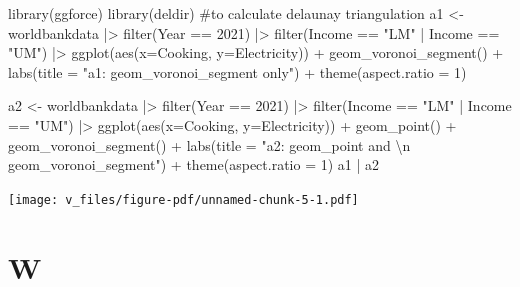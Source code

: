 \documentclass[
  letterpaper,
  DIV=11,
  numbers=noendperiod]{scrreprt}
\newenvironment{Shaded}{\begin{snugshade}}{\end{snugshade}}
\newcommand{\AttributeTok}[1]{\textcolor[rgb]{0.40,0.45,0.13}{#1}}
\newcommand{\CommentTok}[1]{\textcolor[rgb]{0.37,0.37,0.37}{#1}}
\newcommand{\DecValTok}[1]{\textcolor[rgb]{0.68,0.00,0.00}{#1}}
\newcommand{\FunctionTok}[1]{\textcolor[rgb]{0.28,0.35,0.67}{#1}}
\newcommand{\NormalTok}[1]{\textcolor[rgb]{0.00,0.23,0.31}{#1}}
\newcommand{\OtherTok}[1]{\textcolor[rgb]{0.00,0.23,0.31}{#1}}
\newcommand{\SpecialCharTok}[1]{\textcolor[rgb]{0.37,0.37,0.37}{#1}}
\newcommand{\StringTok}[1]{\textcolor[rgb]{0.13,0.47,0.30}{#1}}
\begin{document}
\begin{Shaded}
\begin{Highlighting}[]
\FunctionTok{library}\NormalTok{(ggforce)}
\FunctionTok{library}\NormalTok{(deldir) }\CommentTok{\#to calculate delaunay triangulation}
\NormalTok{a1 }\OtherTok{\textless{}{-}}\NormalTok{ worldbankdata }\SpecialCharTok{|\textgreater{}}
  \FunctionTok{filter}\NormalTok{(Year }\SpecialCharTok{==} \DecValTok{2021}\NormalTok{) }\SpecialCharTok{|\textgreater{}}
  \FunctionTok{filter}\NormalTok{(Income }\SpecialCharTok{==} \StringTok{"LM"} \SpecialCharTok{|}\NormalTok{ Income }\SpecialCharTok{==} \StringTok{"UM"}\NormalTok{) }\SpecialCharTok{|\textgreater{}}
  \FunctionTok{ggplot}\NormalTok{(}\FunctionTok{aes}\NormalTok{(}\AttributeTok{x=}\NormalTok{Cooking, }\AttributeTok{y=}\NormalTok{Electricity)) }\SpecialCharTok{+}   
  \FunctionTok{geom\_voronoi\_segment}\NormalTok{() }\SpecialCharTok{+}
  \FunctionTok{labs}\NormalTok{(}\AttributeTok{title =} \StringTok{"a1: geom\_voronoi\_segment only"}\NormalTok{) }\SpecialCharTok{+}
  \FunctionTok{theme}\NormalTok{(}\AttributeTok{aspect.ratio =} \DecValTok{1}\NormalTok{)}

\NormalTok{a2 }\OtherTok{\textless{}{-}}\NormalTok{ worldbankdata }\SpecialCharTok{|\textgreater{}}
  \FunctionTok{filter}\NormalTok{(Year }\SpecialCharTok{==} \DecValTok{2021}\NormalTok{) }\SpecialCharTok{|\textgreater{}}
  \FunctionTok{filter}\NormalTok{(Income }\SpecialCharTok{==} \StringTok{"LM"} \SpecialCharTok{|}\NormalTok{ Income }\SpecialCharTok{==} \StringTok{"UM"}\NormalTok{) }\SpecialCharTok{|\textgreater{}}
  \FunctionTok{ggplot}\NormalTok{(}\FunctionTok{aes}\NormalTok{(}\AttributeTok{x=}\NormalTok{Cooking, }\AttributeTok{y=}\NormalTok{Electricity)) }\SpecialCharTok{+}   
  \FunctionTok{geom\_point}\NormalTok{() }\SpecialCharTok{+}
  \FunctionTok{geom\_voronoi\_segment}\NormalTok{() }\SpecialCharTok{+}
  \FunctionTok{labs}\NormalTok{(}\AttributeTok{title =} \StringTok{"a2: geom\_point and }\SpecialCharTok{\textbackslash{}n}\StringTok{ geom\_voronoi\_segment"}\NormalTok{) }\SpecialCharTok{+}
  \FunctionTok{theme}\NormalTok{(}\AttributeTok{aspect.ratio =} \DecValTok{1}\NormalTok{)}
\NormalTok{a1 }\SpecialCharTok{|}\NormalTok{ a2}
\end{Highlighting}
\end{Shaded}

\texttt{[image: v\_files/figure-pdf/unnamed-chunk-5-1.pdf]}

\part{W}
\end{document}
